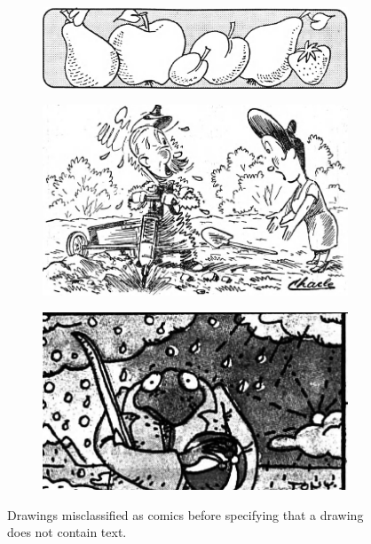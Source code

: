 \begin{figure}[ht]
    \centering

    \begin{subfigure}{0.3\textwidth}
        \includegraphics[width=\linewidth]{Images/EXP-1986-07-04-a-i0361.jpg}
    \end{subfigure}
    \hfill
    \begin{subfigure}{0.3\textwidth}
        \includegraphics[width=\linewidth]{Images/IMP-1949-09-30-a-i0010.jpg}
    \end{subfigure}
    \hfill
    \begin{subfigure}{0.3\textwidth}
        \includegraphics[width=\linewidth]{Images/IMP-1992-02-10-a-i0160.jpg}
    \end{subfigure}

    \caption{Drawings misclassified as comics before specifying that a drawing does not contain text.}
    \label{fig:3.7}
\end{figure} 


